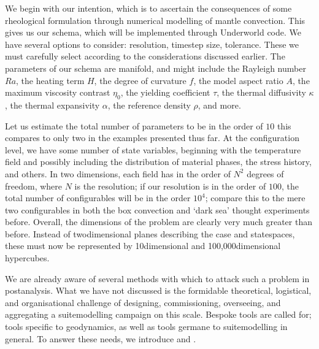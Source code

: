 \documentclass[letterpaper,10pt,english]{jupyterBook}
\begin{document}
\sphinxAtStartPar
We begin with our intention, which is to ascertain the consequences of some rheological formulation through numerical modelling of mantle convection. This gives us our schema, which will be implemented through Underworld code. We have several options to consider: resolution, timestep size, tolerance. These we must carefully select according to the considerations discussed earlier. The parameters of our schema are manifold, and might include the Rayleigh number \(Ra\), the heating term \(H\), the degree of curvature \(f\), the model aspect ratio \(A\), the maximum viscosity contrast \(\eta_0\), the yielding coefficient \(\tau\), the thermal diffusivity \(\kappa\), the thermal expansivity \(\alpha\), the reference density \(\rho\), and more.

\sphinxAtStartPar
Let us estimate the total number of parameters to be in the order of \(10\) \sphinxhyphen{} this compares to only two in the examples presented thus far. At the configuration level, we have some number of state variables, beginning with the temperature field and possibly including the distribution of material phases, the stress history, and others. In two dimensions, each field has in the order of \(N^2\) degrees of freedom, where \(N\) is the resolution; if our resolution is in the order of \(100\), the total number of configurables will be in the order \(10^4\); compare this to the mere two configurables in both the box convection and ‘dark sea’ thought experiments before. Overall, the dimensions of the problem are clearly very much greater than before. Instead of two\sphinxhyphen{}dimensional planes describing the case\sphinxhyphen{} and state\sphinxhyphen{}spaces, these must now be represented by 10\sphinxhyphen{}dimensional and 100,000\sphinxhyphen{}dimensional hypercubes.

\sphinxAtStartPar
We are already aware of several methods with which to attack such a problem in post\sphinxhyphen{}analysis. What we have not discussed is the formidable theoretical, logistical, and organisational challenge of designing, commissioning, overseeing, and aggregating a suite\sphinxhyphen{}modelling campaign on this scale. Bespoke tools are called for; tools specific to geodynamics, as well as tools germane to suite\sphinxhyphen{}modelling in general. To answer these needs, we introduce  and .
\end{document}
